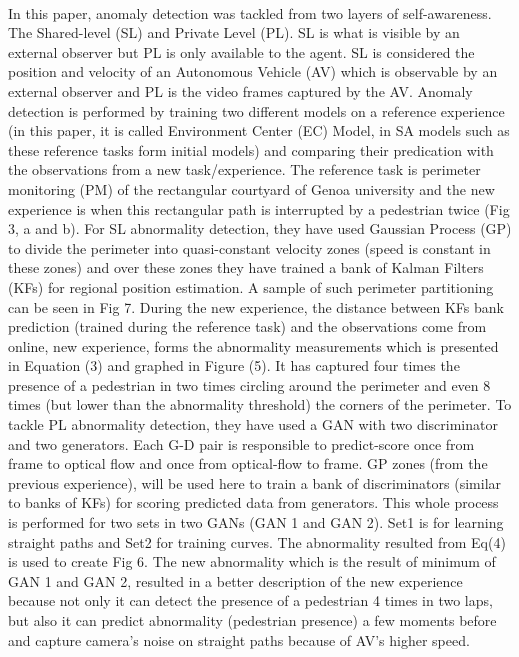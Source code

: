 \documentclass{article}
\begin{document}
				\paragraph{\cite{baydoun-2018-a-multi-perspective-approach-to-anomaly-detection-for-self-aware-embodied-agents}} In this paper, anomaly detection was tackled from two layers of self-awareness. The Shared-level (SL) and Private Level (PL). SL is what is visible by an external observer but PL is only available to the agent. SL is considered the position and velocity of an Autonomous Vehicle (AV) which is observable by an external observer and PL is the video frames captured by the AV. Anomaly detection is performed by training two different models on a reference experience (in this paper, it is called Environment Center (EC) Model, in SA models such as \cite{regazzoni-2020-multi-sensorial-generative-and-descriptive-self-awareness-models-for-autonomous-systems} these reference tasks form initial models) and comparing their predication with the observations from a new task/experience. The reference task is perimeter monitoring (PM) of the rectangular courtyard of Genoa university and the new experience is when this rectangular path is interrupted by a pedestrian twice (Fig 3, a and b). For SL abnormality detection, they have used Gaussian Process (GP) to divide the perimeter into quasi-constant velocity zones (speed is constant in these zones) and over these zones they have trained a bank of Kalman Filters (KFs) for regional position estimation. A sample of such perimeter partitioning can be seen in Fig 7. During the new experience, the distance between KFs bank prediction (trained during the reference task) and the observations come from online, new experience, forms the abnormality measurements which is presented in Equation (3) and graphed in Figure (5).  It has captured four times the presence of a pedestrian in two times circling around the perimeter and even 8 times (but lower than the abnormality threshold) the corners of the perimeter. To tackle PL abnormality detection, they have used a GAN with two discriminator and two generators. Each G-D pair is responsible to predict-score once from frame to optical flow and once from optical-flow to frame. GP zones (from the previous experience), will be used here to train a bank of discriminators (similar to banks of KFs) for scoring predicted data from generators. This whole process is performed for two sets in two GANs (GAN 1 and GAN 2). Set1 is for learning straight paths and Set2 for training curves. The abnormality resulted from Eq(4) is used to create Fig 6. The new abnormality which is the result of minimum of GAN 1 and GAN 2, resulted in a better description of the new experience because not only it can detect the presence of a pedestrian 4 times in two laps, but also it can predict abnormality (pedestrian presence) a few moments before and capture camera's noise on straight paths because of AV's higher speed.                                                
				
\end{document}

